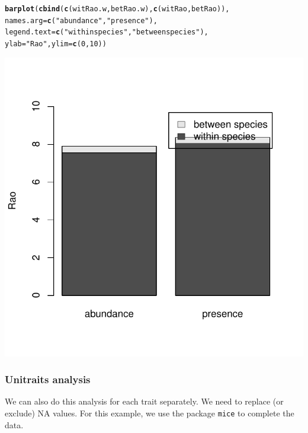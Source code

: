 \documentclass[12pt]{article}\usepackage[]{graphicx}\usepackage[]{color}
\makeatletter
\def\maxwidth{ %
  \ifdim\Gin@nat@width>\linewidth
    \linewidth
  \else
    \Gin@nat@width
  \fi
}
\newcommand{\hlnum}[1]{\textcolor[rgb]{0.686,0.059,0.569}{#1}}%
\newcommand{\hlstr}[1]{\textcolor[rgb]{0.192,0.494,0.8}{#1}}%
\newcommand{\hlstd}[1]{\textcolor[rgb]{0.345,0.345,0.345}{#1}}%
\newcommand{\hlkwc}[1]{\textcolor[rgb]{0.333,0.667,0.333}{#1}}%
\newcommand{\hlkwd}[1]{\textcolor[rgb]{0.737,0.353,0.396}{\textbf{#1}}}%
\newenvironment{kframe}{%
 \def\at@end@of@kframe{}%
 \ifinner\ifhmode%
  \def\at@end@of@kframe{\end{minipage}}%
  \begin{minipage}{\columnwidth}%
 \fi\fi%
 \def\FrameCommand##1{\hskip\@totalleftmargin \hskip-\fboxsep
 \colorbox{shadecolor}{##1}\hskip-\fboxsep
     \hskip-\linewidth \hskip-\@totalleftmargin \hskip\columnwidth}%
 \MakeFramed {\advance\hsize-\width
   \@totalleftmargin\z@ \linewidth\hsize
   \@setminipage}}%
 {\par\unskip\endMakeFramed%
 \at@end@of@kframe}
\newenvironment{knitrout}{}{} %
\makeatother
\begin{document}
\begin{knitrout}
\color{fgcolor}\begin{kframe}
\begin{alltt}
\hlkwd{barplot}\hlstd{(}\hlkwd{cbind}\hlstd{(}\hlkwd{c}\hlstd{(witRao.w, betRao.w),} \hlkwd{c}\hlstd{(witRao, betRao)),}
    \hlkwc{names.arg} \hlstd{=} \hlkwd{c}\hlstd{(}\hlstr{"abundance"} \hlstd{,}\hlstr{"presence"}\hlstd{),}
    \hlkwc{legend.text} \hlstd{=} \hlkwd{c}\hlstd{(}\hlstr{"within species"}\hlstd{,} \hlstr{"between species"}\hlstd{),}
    \hlkwc{ylab} \hlstd{=} \hlstr{"Rao"}\hlstd{,} \hlkwc{ylim} \hlstd{=} \hlkwd{c}\hlstd{(}\hlnum{0}\hlstd{,}\hlnum{10}\hlstd{))}
\end{alltt}
\end{kframe}

{\centering \includegraphics[width=\maxwidth]{figure/unnamed-chunk-18} 

}



\end{knitrout}


\subsubsection{Unitraits analysis}
We can also do this analysis for each trait separately. We need to replace (or exclude) NA values. For this example, we use the package \texttt{mice} to complete the data.
\end{document}
